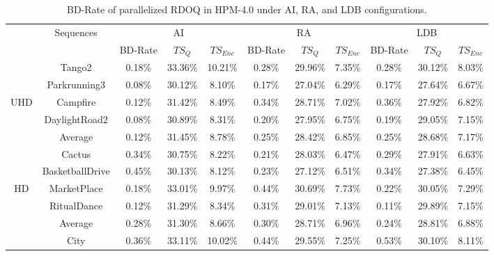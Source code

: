 \documentclass[lettersize,journal]{IEEEtran}
\begin{document}
\begin{table}[!t]
	\caption{BD-Rate of parallelized RDOQ in HPM-4.0 under AI, RA, and LDB configurations.}
    \label{tab:BD-Rate}
	\centering
	\tabcolsep 8pt  %
	\arrayrulewidth 0.75pt
	\begin{tabular}{c | c | c   c   c | c   c   c | c   c   c } 
		\midrule[0.75pt] \specialrule{0em}{0.35pt}{0.35pt} \midrule[0.75pt] %
		\multirow{2}{*}{Class} & \multirow{2}{*}{Sequences} & \multicolumn{3}{c|}{AI} & \multicolumn{3}{c|}{RA} & \multicolumn{3}{c}{LDB} \\ 
		\cmidrule[0.75pt]{3-11} 
		       &                & BD-Rate & $TS_{Q}$ & $TS_{Enc}$ & BD-Rate & $TS_{Q}$ & $TS_{Enc}$ & BD-Rate & $ TS_{Q}$ & $TS_{Enc}$  \\   
		\cmidrule[0.75pt]{1-11}  
		       & Tango2         & 0.18\% & 33.36\% &10.21\% & 0.28\% & 29.96\% & 7.35\% & 0.28\% & 30.12\% & 8.03\% \\ 
		       & Parkrunning3   & 0.08\% & 30.12\% & 8.10\% & 0.17\% & 27.04\% & 6.29\% & 0.17\% & 27.64\% & 6.67\% \\  
		   UHD & Campfire       & 0.12\% & 31.42\% & 8.49\% & 0.34\% & 28.71\% & 7.02\% & 0.36\% & 27.92\% & 6.82\% \\           
	           & DaylightRoad2  & 0.08\% & 30.89\% & 8.31\% & 0.20\% & 27.95\% & 6.75\% & 0.19\% & 29.05\% & 7.15\% \\   
	    \cmidrule[0.75pt]{2-11} 
	           & Average        & 0.12\% & 31.45\% & 8.78\% & 0.25\% & 28.42\% & 6.85\% & 0.25\% & 28.68\% & 7.17\% \\ 
	    \cmidrule[0.75pt]{1-11}  
	           & Cactus         & 0.34\% & 30.75\% & 8.22\% & 0.21\% & 28.03\% & 6.47\% & 0.29\% & 27.91\% & 6.63\% \\          
	           & BasketballDrive& 0.45\% & 30.13\% & 8.12\% & 0.23\% & 27.12\% & 6.51\% & 0.34\% & 27.38\% & 6.45\% \\  
	      HD   & MarketPlace    & 0.18\% & 33.01\% & 9.97\% & 0.44\% & 30.69\% & 7.73\% & 0.22\% & 30.05\% & 7.29\% \\                    
	           & RitualDance    & 0.12\% & 31.29\% & 8.34\% & 0.31\% & 29.01\% & 7.13\% & 0.11\% & 29.89\% & 7.15\% \\   
	    \cmidrule[0.75pt]{2-11} 
	           & Average        & 0.28\% & 31.30\% & 8.66\% & 0.30\% & 28.71\% & 6.96\% & 0.24\% & 28.81\% & 6.88\% \\ 
	    \cmidrule[0.75pt]{1-11}  
	           & City           & 0.36\% & 33.11\% &10.02\% & 0.44\% & 29.55\% & 7.25\% & 0.53\% & 30.10\% & 8.11\% \\          

\end{tabular}
\end{table}
\end{document}
